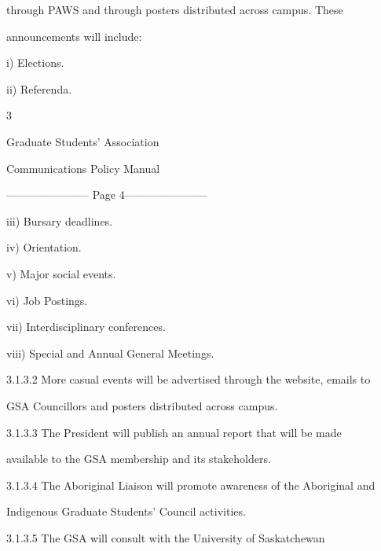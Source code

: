          through  PAWS  and  through  posters  distributed  across  campus.  These  

         announcements will include:   

  

    i)       Elections.   

  

    ii)      Referenda.   

                                                    3  

                                    

                                  Graduate Students’ Association  

                                  Communications Policy Manual  

  


----------------------- Page 4-----------------------

  

     iii)     Bursary deadlines.   

  

     iv)      Orientation.  

  

     v)       Major social events.   

  

     vi)      Job Postings.   

  

     vii)     Interdisciplinary conferences.  

  

     viii)    Special and Annual General Meetings.   

  

3.1.3.2            More casual events will be advertised through the website, emails to  

          GSA Councillors and posters distributed across campus.   

  

3.1.3.3            The  President  will  publish   an  annual  report  that  will  be  made  

          available to the GSA membership and its stakeholders.   

  

3.1.3.4            The Aboriginal Liaison will promote awareness of the Aboriginal and  

         Indigenous Graduate Students’ Council activities.   

  

3.1.3.5            The      GSA       will     consult      with      the    University         of    Saskatchewan  

